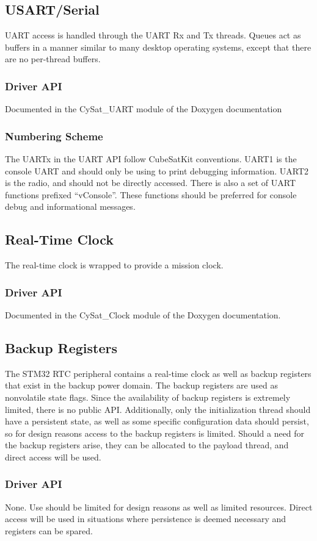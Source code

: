 \documentclass{article}
\begin{document}
\subsection{USART/Serial}
UART access is handled through the UART Rx and Tx threads. Queues act as
buffers in a manner similar to many desktop operating systems, except that
there are no per-thread buffers.
\subsubsection{Driver API}
Documented in the CySat\_UART module of the Doxygen documentation
\subsubsection{Numbering Scheme}
The UARTx in the UART API follow CubeSatKit conventions. UART1 is the console
UART and should only be using to print debugging information. UART2 is the radio, and
should not be directly accessed. There is also a set of UART functions prefixed ``vConsole''.
These functions should be preferred for console debug and informational messages.

\subsection{Real-Time Clock}
The real-time
clock is wrapped to provide a mission clock.
\subsubsection{Driver API}
Documented in the CySat\_Clock module of the Doxygen documentation.

\subsection{Backup Registers}
The STM32 RTC peripheral contains a real-time clock as well as 
backup registers that exist in the backup power domain. The backup registers are 
used as nonvolatile state flags. Since the availability of backup registers
is extremely limited, there is no public API. Additionally, only the
initialization thread should have a persistent state, as well as some 
specific configuration data should persist, so for design reasons
access to the backup registers is limited. Should a need for the backup
registers arise, they can be allocated to the payload thread, and direct
access will be used.
\subsubsection{Driver API}
None. Use should be limited for design reasons as well as limited resources. Direct
access will be used in situations where persistence is deemed necessary and
registers can be spared.
\end{document}
